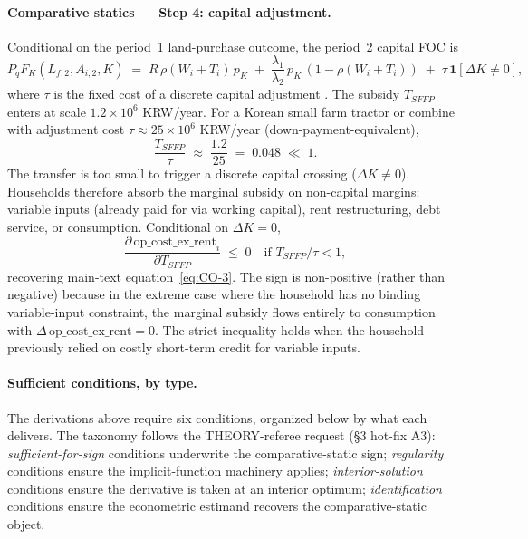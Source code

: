 \documentclass[11pt, a4paper]{article}
\begin{document}
\paragraph{Comparative statics --- Step 4: capital adjustment.} Conditional on
the period~1 land-purchase outcome, the period~2 capital FOC is
\begin{equation}
P_q F_K(L_{f,2}, A_{i,2}, K) \;=\; R\, \rho(W_i + T_i)\, p_K \;+\; \frac{\lambda_1}{\lambda_2}\, p_K\, (1 - \rho(W_i + T_i)) \;+\; \tau\, \mathbf{1}[\Delta K \ne 0],
\label{eq:appB-foc-K}
\end{equation}
where $\tau$ is the fixed cost of a discrete capital adjustment
\citep[parallel to the (S,s) inaction band of][]{CaballeroEngel1999_lumpy}. The
subsidy $T_{SFFP}$ enters at scale $1.2 \times 10^6$ KRW/year. For a Korean
small farm tractor or combine with adjustment cost $\tau \approx 25 \times 10^6$
KRW/year (down-payment-equivalent),
\begin{equation}
\frac{T_{SFFP}}{\tau} \;\approx\; \frac{1.2}{25} \;=\; 0.048 \;\ll\; 1.
\label{eq:appB-ratio}
\end{equation}
The transfer is too small to trigger a discrete capital crossing
($\Delta K \ne 0$). Households therefore absorb the marginal subsidy on
non-capital margins: variable inputs (already paid for via working capital),
rent restructuring, debt service, or consumption. Conditional on $\Delta K = 0$,
\begin{equation}
\boxed{\frac{\partial\, \text{op\_cost\_ex\_rent}_i}{\partial T_{SFFP}} \;\le\; 0 \quad \text{if } T_{SFFP}/\tau < 1,}
\label{eq:appB-step4}
\end{equation}
recovering main-text equation~\ref{eq:CO-3}. The sign is non-positive (rather
than negative) because in the extreme case where the household has no binding
variable-input constraint, the marginal subsidy flows entirely to consumption
with $\Delta\, \text{op\_cost\_ex\_rent} = 0$. The strict inequality holds when
the household previously relied on costly short-term credit for variable inputs.

\paragraph{Sufficient conditions, by type.} The derivations above require six
conditions, organized below by what each delivers. The taxonomy follows the
THEORY-referee request (\S 3 hot-fix A3): \textit{sufficient-for-sign} conditions
underwrite the comparative-static sign; \textit{regularity} conditions ensure
the implicit-function machinery applies; \textit{interior-solution} conditions
ensure the derivative is taken at an interior optimum; \textit{identification}
conditions ensure the econometric estimand recovers the comparative-static
object.
\end{document}
